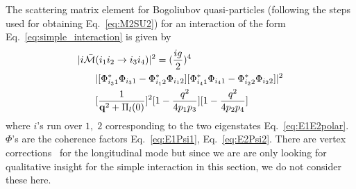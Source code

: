 \documentclass[10pt, aps, prd, superscriptaddress, nofootinbib, 
               amsmath, amssymb, twocolumn,
               preprintnumbers, showpacs,
               raggedbottom,
               floatfix]{revtex4-1}
\newcommand{\slsh}[1]{#1\!\!\!/}
\newcommand{\tr}{{\rm{tr}}}
\newcommand{\bfq}{{\bf{q}}}
\begin{document}
The scattering matrix element for Bogoliubov quasi-particles (following the
steps used for obtaining Eq.~\ref{eq:M2SU2}) for an interaction of the form
Eq.~\ref{eq:simple_interaction} is given by
\begin{equation}
\begin{split}
|i\bar{\cal{M}}&(i_1i_2\rightarrow i_3i_4)|^2 
 = (\frac{ig}{2})^4\\
&|
[\Phi_{i_3 1}^*\Phi_{i_3 1}-\Phi_{i_1 2}^*\Phi_{i_1 2}]
[\Phi_{i_4 1}^*\Phi_{i_4 1}-\Phi_{i_2 2}^*\Phi_{i_2 2}]|^2\\
&
[\frac{1}{\bfq^2+\Pi_l(0)}]^2[1-\frac{q^2}{4p_1p_3}][1-\frac{q^2}{4p_2p_4}]
~\label{eq:M2_8}
\end{split}
\end{equation}
where $i$'s run over $1,\;2$ corresponding to the two eigenstates
Eq.~\ref{eq:E1E2polar}. $\Phi$'s are the coherence factors Eq.~\ref{eq:E1Psi1},
Eq.~\ref{eq:E2Psi2}. There are vertex
corrections~\cite{schrieffer1983theory} for the longitudinal
mode but since we are are only looking for qualitative insight for the simple
interaction in this section, we do not consider these here.
\end{document}
